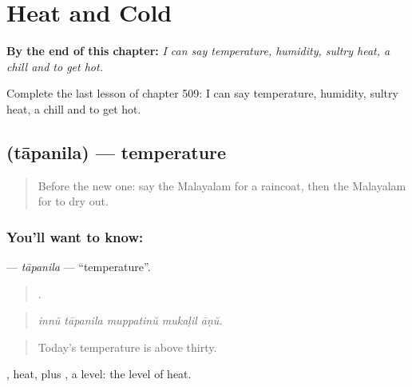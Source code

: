 
\chapter{Heat and Cold}
\label{ch:ml-heat-and-cold}

\begin{chapteropening}
\textbf{By the end of this chapter:} \emph{I can say temperature, humidity, sultry heat, a chill and to get hot.}

Complete the last lesson of chapter 509: I can say temperature, humidity, sultry heat, a chill and to get hot.
\end{chapteropening}

\section[\texorpdfstring{\ml{താപനില} (tāpanila)}{താപനില (tāpanila)}]{ (tāpanila) — temperature}

\label{lesson:ML-C509-tapanila}



\begin{quote}
Before the new one: say the Malayalam for a raincoat, then the Malayalam for to dry out.
\end{quote}

\subsection*{You'll want to know: }
\textbf{} — \emph{tāpanila} — \textquotedblleft{}temperature\textquotedblright{}.

\begin{quote}
    .
\end{quote}

\begin{quote}
\emph{innŭ tāpanila muppatinŭ mukaḷil āṇŭ.}
\end{quote}

\begin{quote}
Today's temperature is above thirty.
\end{quote}

, heat, plus , a level: the level of heat.

